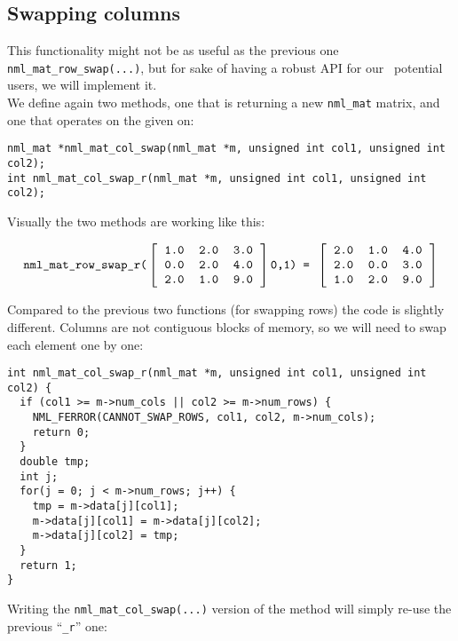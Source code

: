 \subsection{Swapping columns}

This functionality might not be as useful as the previous one {\tt nml\_mat\_row\_swap(...)}, but for sake of having a robust API for our ~potential~ users, we will implement it.
\\

We define again two methods, one that is returning a new {\tt nml\_mat} matrix, and one that operates on the given on:
\\

\begin{verbatim}
nml_mat *nml_mat_col_swap(nml_mat *m, unsigned int col1, unsigned int col2);
int nml_mat_col_swap_r(nml_mat *m, unsigned int col1, unsigned int col2); 
\end{verbatim}

Visually the two methods are working like this:

$$
\texttt{nml\_mat\_row\_swap\_r(}
\left[ \begin{tabular}{rrr}
\tt 1.0 & \tt 2.0 & \tt 3.0 \\
\tt 0.0 & \tt 2.0 & \tt 4.0 \\
\tt 2.0 & \tt 1.0 & \tt 9.0
\end{tabular} \right]
\texttt{0,1) = }
\left[ \begin{tabular}{rrr}
\tt 2.0 & \tt 1.0 & \tt 4.0 \\
\tt 2.0 & \tt 0.0 & \tt 3.0 \\
\tt 1.0 & \tt 2.0 & \tt 9.0
\end{tabular} \right]
$$

Compared to the previous two functions (for swapping rows) the code is slightly different. Columns are not contiguous blocks of memory, so we will need to swap each element one by one:

\begin{verbatim}
int nml_mat_col_swap_r(nml_mat *m, unsigned int col1, unsigned int col2) {
  if (col1 >= m->num_cols || col2 >= m->num_rows) {
    NML_FERROR(CANNOT_SWAP_ROWS, col1, col2, m->num_cols);
    return 0;
  }
  double tmp;
  int j;
  for(j = 0; j < m->num_rows; j++) {
    tmp = m->data[j][col1];
    m->data[j][col1] = m->data[j][col2];
    m->data[j][col2] = tmp;
  }
  return 1;
}
\end{verbatim}

Writing the {\tt nml\_mat\_col\_swap(...)} version of the method will simply re-use the previous ``{\tt \_r}'' one:

